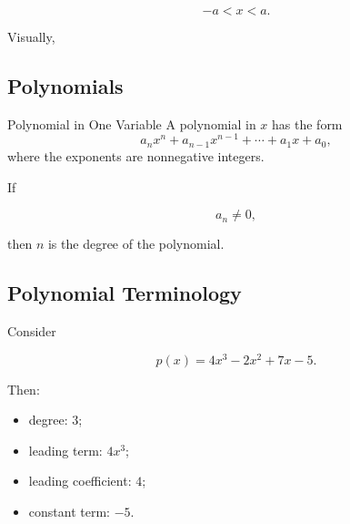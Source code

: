 \[ -a<x<a. \]

Visually,

\begin{center}
\end{center}

\subsection{Polynomials}
\label{subsec:polynomials}

\begin{definitionbox}{Polynomial in One Variable}
A polynomial in \(x\) has the form
\[ a_nx^n+a_{n-1}x^{n-1}+\cdots+a_1x+a_0, \]
where the exponents are nonnegative integers.
\end{definitionbox}

If

\[ a_n\neq0, \]

then \(n\) is the degree of the polynomial.

\subsection{Polynomial Terminology}
\label{subsec:polynomial-terminology}

Consider

\[ p(x)=4x^3-2x^2+7x-5. \]

Then:

\begin{itemize}
    \item degree: \(3\);
    \item leading term: \(4x^3\);
    \item leading coefficient: \(4\);
    \item constant term: \(-5\).
\end{itemize}

